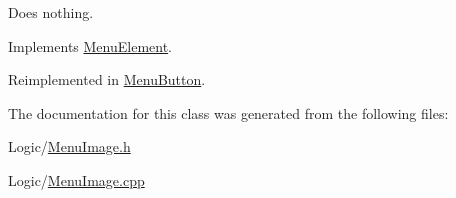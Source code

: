 Does nothing. 



Implements \hyperlink{classMenuElement_a025aeb7bf41cf9ca7069dba7dbf07f47}{Menu\+Element}.



Reimplemented in \hyperlink{classMenuButton_a929dfef7a69a776f4b1da3d151236dcb}{Menu\+Button}.



The documentation for this class was generated from the following files\+:\begin{DoxyCompactItemize}
\item 
Logic/\hyperlink{MenuImage_8h}{Menu\+Image.\+h}\item 
Logic/\hyperlink{MenuImage_8cpp}{Menu\+Image.\+cpp}\end{DoxyCompactItemize}
